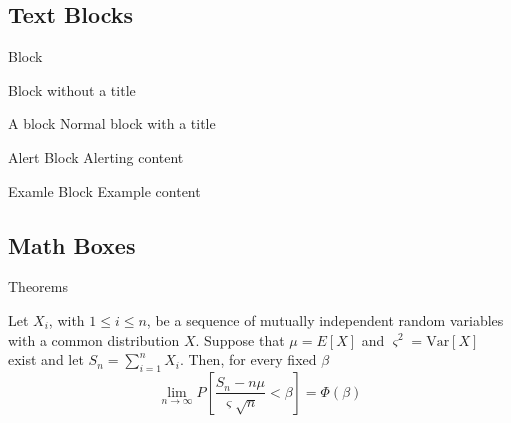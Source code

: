 \documentclass[aspectratio=169,envcountsect]{beamer}    %
\begin{document}
\subsection{Text Blocks}
\begin{frame}{Block}
	\begin{block}{}
		Block without a title
	\end{block}
	\begin{block}{A block}
		Normal block with a title
	\end{block}
	\begin{alertblock}{Alert Block}
		Alerting content
	\end{alertblock}
	\begin{exampleblock}{Examle Block}
		Example content
	\end{exampleblock}
\end{frame}

\subsection{Math Boxes}
\begin{frame}{Theorems}
	\begin{theorem}
		Let $X_{i}$, with $1 \leq i \leq n$, be a sequence of mutually independent random variables with a common distribution $X$. Suppose that $\mu = E[X]$ and $\varsigma^2=\text{Var}[X]$ exist and let $S_n = \sum_{i=1}^n X_i$. Then, for every fixed $\beta$
		\[
			\lim_{n\to\infty} P\left[\frac{S_n - n\mu}{\varsigma\sqrt{n}} < \beta \right] = \Phi(\beta)
		\]
	\end{theorem}
\end{frame}
\end{document}

